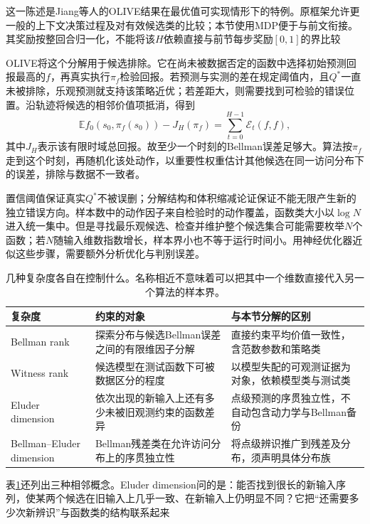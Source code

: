 这一陈述是Jiang等人的OLIVE结果在最优值可实现情形下的特例。原框架允许更一般的上下文决策过程及对有效候选类的比较；本节使用MDP便于与前文衔接。其奖励按整回合归一化，不能将该$H$依赖直接与前节每步奖励$[0,1]$的界比较

OLIVE将这个分解用于候选排除。它在尚未被数据否定的函数中选择初始预测回报最高的$f$，再真实执行$\pi_f$检验回报。若预测与实测的差在规定阈值内，且$Q^*$一直未被排除，乐观预测就支持该策略近优；若差距大，则需要找到可检验的错误位置。沿轨迹将候选的相邻价值项抵消，得到
\[
 \mathbb E f_0(s_0,\pi_f(s_0))-J_H(\pi_f)
                 =\sum_{t=0}^{H-1}\mathcal E_t(f,f),
\]
其中$J_H$表示该有限时域总回报。故至少一个时刻的Bellman误差足够大。算法按$\pi_f$走到这个时刻，再随机化该处动作，以重要性权重估计其他候选在同一访问分布下的误差，排除与数据不一致者。

置信阈值保证真实$Q^*$不被误删；分解结构和体积缩减论证保证不能无限产生新的独立错误方向。样本数中的动作因子来自检验时的动作覆盖，函数类大小以$\log N$进入统一集中。但是寻找最乐观候选、检查并维护整个候选集合可能需要枚举$N$个函数；若$N$随输入维数指数增长，样本界小也不等于运行时间小。用神经优化器近似这些步骤，需要额外分析优化与判别误差。

\begin{table}[t]
  \centering
  \small
  \begin{tabularx}{\linewidth}{>{\raggedright\arraybackslash}p{28mm} >{\raggedright\arraybackslash}X >{\raggedright\arraybackslash}X}
    \toprule
    复杂度 & 约束的对象 & 与本节分解的区别 \\
    \midrule
    Bellman rank & 探索分布与候选Bellman误差之间的有限维因子分解 & 直接约束平均价值一致性，含范数参数和策略类 \\
    Witness rank & 候选模型在测试函数下可被数据区分的程度 & 以模型失配的可观测证据为对象，依赖模型类与测试类 \\
    Eluder dimension & 依次出现的新输入上还有多少未被旧观测约束的函数差异 & 点级预测的序贯独立性，不自动包含动力学与Bellman备份 \\
    Bellman--Eluder dimension & Bellman残差类在允许访问分布上的序贯独立性 & 将点级辨识推广到残差及分布，须声明具体分布族 \\
    \bottomrule
  \end{tabularx}
  \caption{几种复杂度各自在控制什么。名称相近不意味着可以把其中一个维数直接代入另一个算法的样本界。}
  \label{tab:rl-learning-function-complexities}
\end{table}

表\ref{tab:rl-learning-function-complexities}还列出三种相邻概念。Eluder dimension问的是：能否找到很长的新输入序列，使某两个候选在旧输入上几乎一致、在新输入上仍明显不同？它把“还需要多少次新辨识”与函数类的结构联系起来

